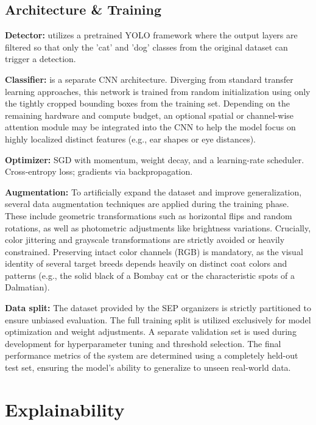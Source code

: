 \documentclass[10pt,twocolumn,letterpaper]{article}
\begin{document}
\subsection{Architecture \& Training}

\textbf{Detector:} utilizes a pretrained YOLO framework where the output layers are filtered so that only the 'cat' and 'dog' classes from the original dataset can trigger a detection.

\textbf{Classifier:} is a separate CNN architecture. Diverging from standard transfer learning approaches, this network is trained from random initialization using only the tightly cropped bounding boxes from the training set. Depending on the remaining hardware and compute budget, an optional spatial or channel-wise attention module may be integrated into the CNN to help the model focus on highly localized distinct features (e.g., ear shapes or eye distances).

\textbf{Optimizer:} SGD with momentum, weight decay, and a learning-rate scheduler. Cross-entropy loss; gradients via backpropagation.

\textbf{Augmentation:} To artificially expand the dataset and improve generalization, several data augmentation techniques are applied during the training phase. These include geometric transformations such as horizontal flips and random rotations, as well as photometric adjustments like brightness variations. Crucially, color jittering and grayscale transformations are strictly avoided or heavily constrained. Preserving intact color channels (RGB) is mandatory, as the visual identity of several target breeds depends heavily on distinct coat colors and patterns (e.g., the solid black of a Bombay cat or the characteristic spots of a Dalmatian).

\textbf{Data split:} The dataset provided by the SEP organizers is strictly partitioned to ensure unbiased evaluation. The full training split is utilized exclusively for model optimization and weight adjustments. A separate validation set is used during development for hyperparameter tuning and threshold selection. The final performance metrics of the system are determined using a completely held-out test set, ensuring the model's ability to generalize to unseen real-world data.

\section{Explainability}
\label{sec:xai}
\end{document}
